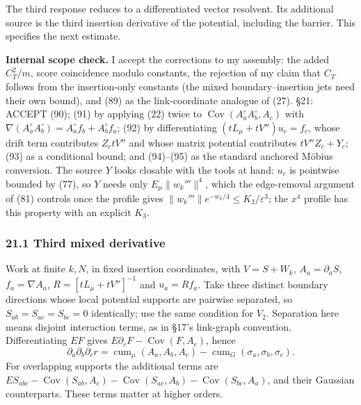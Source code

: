 \documentclass[11pt,a4paper]{article}
\begin{document}
The third response reduces to a differentiated vector resolvent. Its
additional source is the third insertion derivative of the potential,
including the barrier. This specifies the next estimate.

\textbf{Internal scope check.} I accept the corrections to my assembly:
the added \(C_T^2/m\), score coincidence modulo constants, the rejection
of my claim that \(C_T\) follows from the insertion-only constants (the
mixed boundary--insertion jets need their own bound), and (89) as the
link-coordinate analogue of (27). §21: ACCEPT (90); (91) by applying
(22) twice to \(\operatorname{Cov}(A_a^\circ A_b^\circ,A_c)\) with
\(\nabla(A_a^\circ A_b^\circ)=A_a^\circ f_b+A_b^\circ f_a\); (92) by
differentiating \((tL_\mu+tV'')u_c=f_c\), whose drift term contributes
\(Z_ctV''\) and whose matrix potential contributes \(tV''Z_c+Y_c\); (93)
as a conditional bound; and (94)--(95) as the standard anchored Möbius
conversion. The source \(Y\) looks closable with the tools at hand:
\(u_c\) is pointwise bounded by (77), so \(Y\) needs only
\(E_\mu\|w_k'''\|^4\), which the edge-removal argument of (81) controls
once the profile gives \(\|w_k'''\|e^{-w_k/4}\le K_3/\varepsilon^3\);
the \(x^4\) profile has this property with an explicit \(K_3\).

\hypertarget{third-mixed-derivative}{%
\subsubsection{21.1 Third mixed
derivative}\label{third-mixed-derivative}}

Work at finite \(k,N\), in fixed insertion coordinates, with
\(V=S+W_k\), \(A_a=\partial_aS\), \(f_a=\nabla A_a\),
\(R=[tL_\mu+tV'']^{-1}\) and \(u_a=Rf_a\). Take three distinct boundary
directions whose local potential supports are pairwise separated, so
\(S_{ab}=S_{ac}=S_{bc}=0\) identically; use the same condition for
\(V_2\). Separation here means disjoint interaction terms, as in §17's
link-graph convention. Differentiating \(E F\) gives
\(E\partial_cF-\operatorname{Cov}(F,A_c)\), hence
\[\partial_a\partial_b\partial_c r
=\operatorname{cum}_\mu(A_a,A_b,A_c)
-\operatorname{cum}_G(\sigma_a,\sigma_b,\sigma_c).\tag{90}\] For
overlapping supports the additional terms are
\(E S_{abc}-\operatorname{Cov}(S_{ab},A_c) -\operatorname{Cov}(S_{ac},A_b)-\operatorname{Cov}(S_{bc},A_a)\),
and their Gaussian counterparts. These terms matter at higher orders.
\end{document}
